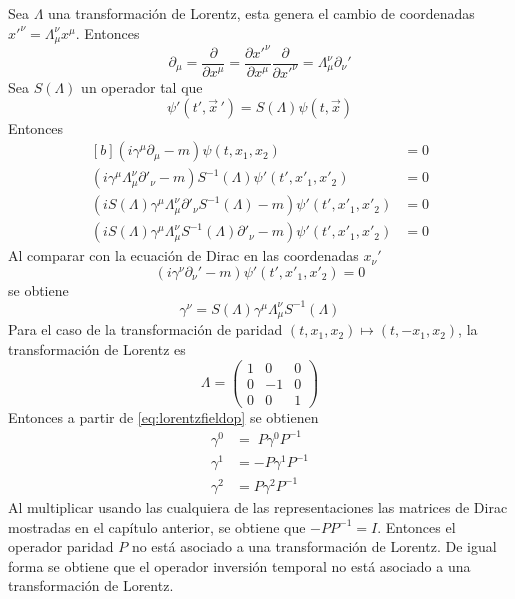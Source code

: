 Sea $\Lambda$ una transformación de Lorentz, esta genera el cambio de coordenadas $x'^\nu = \Lambda_\mu^\nu x^\mu$. Entonces
\begin{equation}
	\partial_\mu = \frac{\partial }{\partial x^\mu} = \frac{\partial x'^\nu}{\partial x^\mu}\frac{\partial }{\partial x'^\nu} = \Lambda_\mu^\nu\partial_\nu'
\end{equation}
Sea $S(\Lambda)$ un operador tal que
\begin{equation}
	\psi'(t',\vec{x}\,') = S(\Lambda) \psi(t,\vec{x})
\end{equation}
Entonces
\begin{equation}
	\begin{aligned}[b]
		(i\gamma^\mu\partial_\mu - m)\psi(t,x_1,x_2)                                                & = 0 \\
		(i\gamma^\mu\Lambda_\mu^\nu\partial'_\nu - m)S^{-1}(\Lambda)\psi'(t',x'_1,x'_2)             & =0  \\
		(iS(\Lambda)\gamma^\mu\Lambda_\mu^\nu\partial'_\nu S^{-1}(\Lambda) - m)\psi'(t',x'_1,x'_2)  & =0  \\
		(iS(\Lambda)\gamma^\mu\Lambda_\mu^\nu S^{-1}(\Lambda)\partial'_\nu  - m)\psi'(t',x'_1,x'_2) & =0
	\end{aligned}
\end{equation}
Al comparar con la ecuación de Dirac en las coordenadas $x_\nu'$
\begin{equation}
	(i\gamma^\nu \partial_\nu' -m )\psi'(t',x'_1,x'_2) = 0
\end{equation}
se obtiene
\begin{equation}
	\gamma^\nu = S(\Lambda) \gamma^\mu \Lambda_\mu^{\nu}S^{-1}(\Lambda)\label{eq:lorentzfieldop}
\end{equation}
Para el caso de la transformación de paridad $(t,x_1,x_2)\mapsto (t,-x_1,x_2)$, la transformación de Lorentz es
\begin{equation}
	\Lambda = \begin{pmatrix}
		1 & 0  & 0 \\
		0 & -1 & 0 \\
		0 & 0  & 1
	\end{pmatrix}
\end{equation}
Entonces a partir de \eqref{eq:lorentzfieldop} se obtienen
\begin{equation}
	\begin{split}
		\gamma^0 & = \;P\gamma^0 P^{-1} \\
		\gamma^1 & = -P\gamma^1 P^{-1}  \\
		\gamma^2 & = P\gamma^2 P^{-1}
	\end{split}
\end{equation}
Al multiplicar usando las cualquiera de las representaciones las matrices de Dirac mostradas en el capítulo anterior, se obtiene que $-PP^{-1} = I$. Entonces el operador paridad $P$ no está asociado a una transformación de Lorentz.
De igual forma se obtiene que el operador inversión temporal no está asociado a una transformación de Lorentz.
